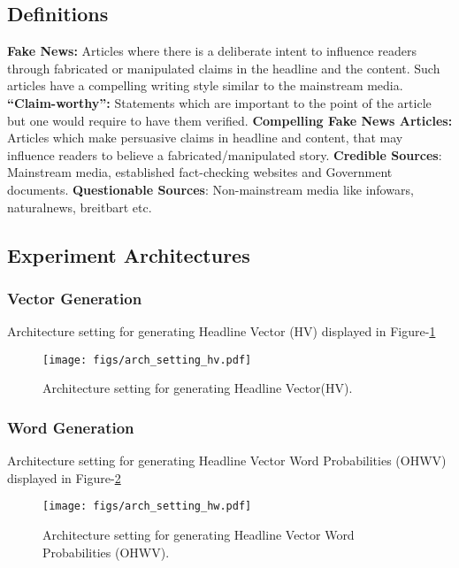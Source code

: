 \documentclass[11pt,a4paper]{article}
\begin{document}
\subsection{Definitions}
\label{sect:definition}
\textbf{Fake News:} Articles where there is a deliberate intent to influence readers through fabricated or manipulated claims in the headline and the content. Such articles have a compelling writing style similar to the mainstream media. \newline
\textbf{``Claim-worthy'':} Statements which are important to the point of the article but one would require to have them verified. \newline
\textbf{Compelling Fake News Articles:} Articles which make persuasive claims in headline and content, that may influence readers to believe a fabricated/manipulated story. \newline 
\textbf{Credible Sources}:  Mainstream media, established fact-checking websites and Government documents. \newline
\textbf{Questionable Sources}:  Non-mainstream media like infowars, naturalnews, breitbart etc.

\subsection{Experiment Architectures}
\subsubsection{Vector Generation}
Architecture setting for generating Headline Vector (HV) displayed in Figure-\ref{fig:arch_setting_hv}
\begin{figure}[h]
\begin{center}
\texttt{[image: figs/arch\_setting\_hv.pdf]}
\caption{\label{fig:arch_setting_hv}Architecture setting for generating Headline Vector(HV).}
\end{center}
\end{figure}
\subsubsection{Word Generation}
Architecture setting for generating Headline Vector Word Probabilities (OHWV) displayed in Figure-\ref{fig:arch_setting_ohw}
\begin{figure}[h]
\begin{center}
\texttt{[image: figs/arch\_setting\_hw.pdf]}
\caption{\label{fig:arch_setting_ohw}Architecture setting for generating Headline Vector Word Probabilities (OHWV).}
\end{center}
\end{figure}
\end{document}
